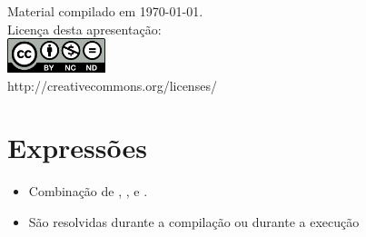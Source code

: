 \documentclass[portuguese,10pt,xcolor=table]{beamer}
\title{\insertlecture}
\author{Prof. Fernando Figueira\\(adaptado do material do Prof. Rafael Beserra Gomes)}
\institute{UFRN}
\date{}
\begin{document}
\begin{frame}
  \maketitle
 \begin{center}
 \tiny
Material compilado em \today.\\
  Licença desta apresentação:\\
		\includegraphics[height=1.0cm]{by-nc-nd.png}\\
http://creativecommons.org/licenses/
	\end{center}
\end{frame}

	\section{Expressões}
	\begin{frame}
	\begin{itemize}
		\item Combinação de , ,  e .
		\item São resolvidas durante a compilação ou durante a execução
	\end{itemize}

	\end{frame}
\end{document}
